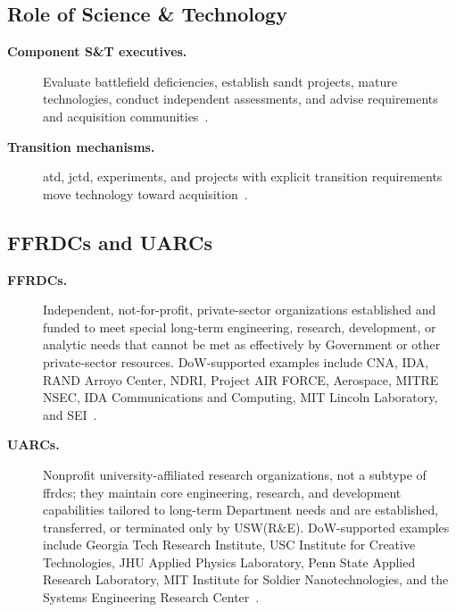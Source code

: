 \documentclass[../main.tex]{subfiles}
\begin{document}
\subsection{Role of Science \& Technology}
\begin{description}
  \item[\textbf{Component S\&T executives.}] Evaluate battlefield deficiencies, establish \ac{sandt} projects, mature technologies, conduct independent assessments, and advise requirements and acquisition communities~\autocite{edo-3-3-4-research-development-2025}.
  \item[\textbf{Transition mechanisms.}] \ac{atd}, \ac{jctd}, experiments, and projects with explicit transition requirements move technology toward acquisition~\autocite{edo-3-3-4-research-development-2025}.
\end{description}

\subsection{FFRDCs and UARCs}
\begin{description}
  \item[\textbf{FFRDCs.}] Independent, not-for-profit, private-sector organizations established and funded to meet special long-term engineering, research, development, or analytic needs that cannot be met as effectively by Government or other private-sector resources. DoW-supported examples include CNA, IDA, RAND Arroyo Center, NDRI, Project AIR FORCE, Aerospace, MITRE NSEC, IDA Communications and Computing, MIT Lincoln Laboratory, and SEI~\autocite{edo-3-3-4-research-development-2025,DoW-FFRDC-UARC-2026}.
  \item[\textbf{UARCs.}] Nonprofit university-affiliated research organizations, not a subtype of \acp{ffrdc}; they maintain core engineering, research, and development capabilities tailored to long-term Department needs and are established, transferred, or terminated only by USW(R\&E). DoW-supported examples include Georgia Tech Research Institute, USC Institute for Creative Technologies, JHU Applied Physics Laboratory, Penn State Applied Research Laboratory, MIT Institute for Soldier Nanotechnologies, and the Systems Engineering Research Center~\autocite{edo-3-3-4-research-development-2025,DoW-FFRDC-UARC-2026}.
\end{description}
\end{document}
